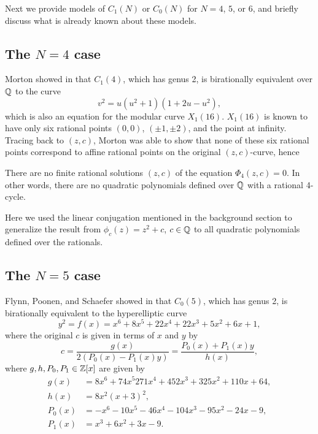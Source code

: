 Next we provide models of $C_1(N)$ or $C_0(N)$ for $N = 4$, $5$, or
$6$, and briefly discuss what is already known about these models.

\subsection{The $N = 4$ case}
\label{subsec:model-4}

Morton showed in \cite{MR1665198} that $C_1(4)$, which has genus 2, is
birationally equivalent over $\mathbb{Q}$ to the curve
\begin{equation}
  \label{eq:c1(4)}
  v^2 = u(u^2 + 1)(1 + 2u - u^2),
\end{equation}
which is also an equation for the modular curve $X_1(16)$. $X_1(16)$
is known to have only six rational points $(0, 0)$, $(\pm 1, \pm 2)$,
and the point at infinity. Tracing back to $(z, c)$, Morton was able
to show that none of these six rational points correspond to affine
rational points on the original $(z, c)$-curve, hence

\begin{theorem}
  There are no finite rational solutions $(z, c)$ of the equation
  $\Phi_4(z, c) = 0$. In other words, there are no quadratic
  polynomials defined over $\mathbb{Q}$ with a rational 4-cycle.
\end{theorem}

\begin{remark}
  Here we used the linear conjugation mentioned in the background
  section to generalize the result from $\phi_c(z) = z^2 + c$, $c \in
  \mathbb{Q}$ to all quadratic polynomials defined over the rationals.
\end{remark}

\subsection{The $N = 5$ case}
\label{subsec:model-5}

Flynn, Poonen, and Schaefer showed in \cite{MR1480542} that $C_0(5)$,
which has genus 2, is birationally equivalent to the hyperelliptic
curve
\begin{equation}
  \label{eq:c0(5)}
  y^2 = f(x) = x^6 + 8x^5 + 22x^4 + 22x^3 + 5x^2 + 6x + 1,
\end{equation}
where the original $c$ is given in terms of $x$ and $y$ by
\begin{equation}
  \label{eq:c-in-xy}
  c = \frac{g(x)}{2(P_0(x) - P_1(x) y)}
  = \frac{P_0(x) + P_1(x) y}{h(x)},
\end{equation}
where $g, h, P_0, P_1 \in \mathbb{Z}[x]$ are given by
\begin{subequations}
  \label{eq:poly-defs}
  \begin{align}
    g(x) & = 8x^6 + 74x^5 271x^4 + 452x^3 + 325x^2 + 110x + 64,\\
    h(x) & = 8x^2(x+3)^2,\\
    P_0(x) & = - x^6 - 10x^5 - 46x^4 - 104x^3 - 95x^2 - 24x - 9,\\
    P_1(x) & = x^3 + 6x^2 + 3x - 9.
  \end{align}
\end{subequations}

